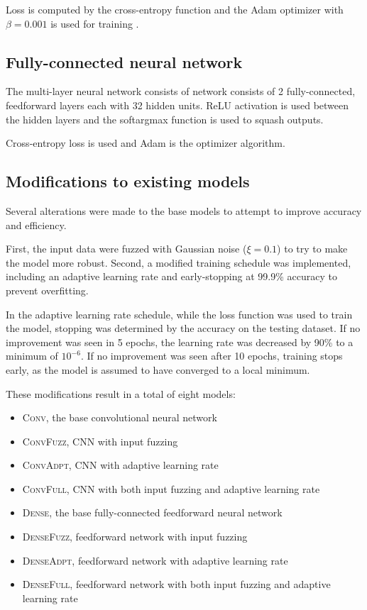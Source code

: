 \documentclass{article}
\begin{document}
Loss is computed by the cross-entropy function and the Adam optimizer with $\beta = 0.001$
is used for training \citep{kingmaAdamMethodStochastic2017}.

\subsection{Fully-connected neural network}

The multi-layer neural network consists of network consists of 2 fully-connected, feedforward layers each with 32 hidden units.
ReLU activation is used between the hidden layers
and the softargmax function is used to squash outputs.

Cross-entropy loss is used and Adam is the optimizer algorithm.

\subsection{Modifications to existing models}

Several alterations were made to the base models to attempt to improve accuracy and efficiency.

First, the input data were fuzzed with Gaussian noise ($\xi = 0.1$)
to try to make the model more robust.
Second, a modified training schedule was implemented, including an adaptive learning rate
and early-stopping at 99.9\% accuracy to prevent overfitting.

In the adaptive learning rate schedule,
while the loss function was used to train the model,
stopping was determined by the accuracy on the testing dataset.
If no improvement was seen in 5 epochs, the learning rate was decreased by 90\%
to a minimum of $10^{-6}$.
If no improvement was seen after 10 epochs, training stops early,
as the model is assumed to have converged to a local minimum.

These modifications result in a total of eight models:

\begin{itemize}
  \item \textsc{Conv}, the base convolutional neural network
  \item \textsc{ConvFuzz}, CNN with input fuzzing
  \item \textsc{ConvAdpt}, CNN with adaptive learning rate
  \item \textsc{ConvFull}, CNN with both input fuzzing and adaptive learning rate
  \item \textsc{Dense}, the base fully-connected feedforward neural network
  \item \textsc{DenseFuzz}, feedforward network with input fuzzing
  \item \textsc{DenseAdpt}, feedforward network with adaptive learning rate
  \item \textsc{DenseFull}, feedforward network with both input fuzzing and adaptive learning rate
\end{itemize}
\end{document}
